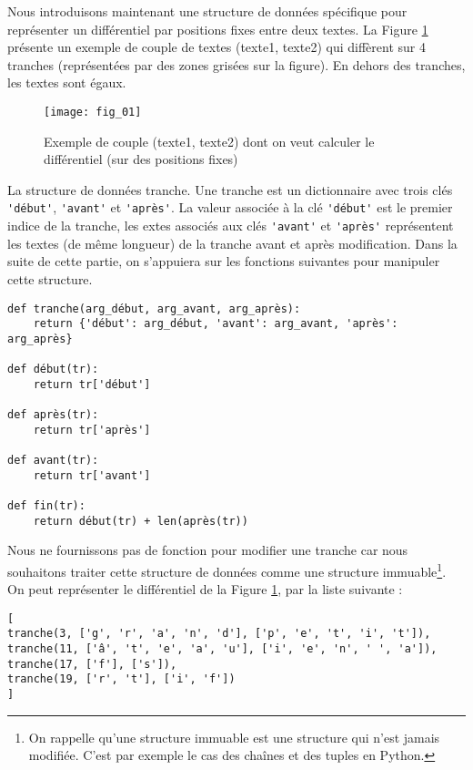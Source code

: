 Nous introduisons maintenant une structure de données spécifique pour représenter un différentiel par positions fixes entre deux textes.
La Figure \ref{fig:01} présente un exemple de couple de textes (texte1, texte2) qui diffèrent sur 4
tranches (représentées par des zones grisées sur la figure). En dehors des tranches, les textes sont
égaux.

\begin{figure}[H]
\centering
\texttt{[image: fig\_01]}
\caption{Exemple de couple (texte1, texte2) dont on veut calculer le différentiel (sur des
positions fixes) \label{fig:01}}
\end{figure}

\begin{defi}{La structure de données tranche.} Une tranche est un dictionnaire avec trois clés \lstinline{'début'},
\lstinline{'avant'} et \lstinline{'après'}. La valeur associée à la clé \lstinline{'début'} est le premier indice de la tranche, les
extes associés aux clés \lstinline{'avant'} et \lstinline{'après'} représentent les textes (de même longueur) de la tranche avant et après modification. Dans la suite de cette partie, on s'appuiera sur les fonctions
suivantes pour manipuler cette structure.
\end{defi}

\begin{lstlisting}
def tranche(arg_début, arg_avant, arg_après):
    return {'début': arg_début, 'avant': arg_avant, 'après': arg_après}

def début(tr):
    return tr['début']

def après(tr):
    return tr['après']

def avant(tr):
    return tr['avant']

def fin(tr):
    return début(tr) + len(après(tr))
\end{lstlisting}

Nous ne fournissons pas de fonction pour modifier une tranche car nous souhaitons traiter
cette structure de données comme une structure immuable\footnote{On rappelle qu'une structure immuable est une structure qui n'est jamais modifiée. C'est par exemple le
cas des chaînes et des tuples en Python.}.
On peut représenter le différentiel de la Figure \ref{fig:01}, par la liste suivante :

\begin{lstlisting}
[
tranche(3, ['g', 'r', 'a', 'n', 'd'], ['p', 'e', 't', 'i', 't']),
tranche(11, ['â', 't', 'e', 'a', 'u'], ['i', 'e', 'n', ' ', 'a']),
tranche(17, ['f'], ['s']),
tranche(19, ['r', 't'], ['i', 'f'])
]
\end{lstlisting}

